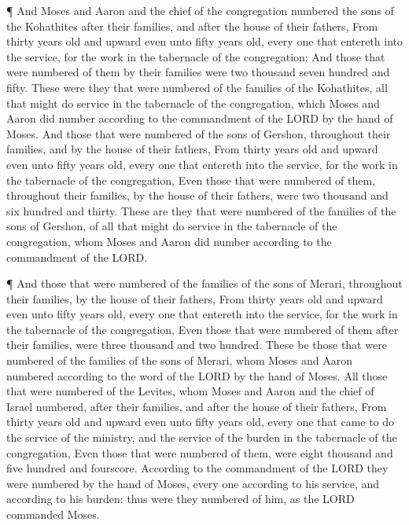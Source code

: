  ¶ And Moses and Aaron and the chief of the congregation
numbered the sons of the Kohathites after their families, and after the
house of their fathers,  From thirty years old and upward
even unto fifty years old, every one that entereth into the service, for
the work in the tabernacle of the congregation:  And those
that were numbered of them by their families were two thousand seven
hundred and fifty.  These were they that were numbered of
the families of the Kohathites, all that might do service in the
tabernacle of the congregation, which Moses and Aaron did number
according to the commandment of the LORD by the hand of Moses.
 And those that were numbered of the sons of Gershon,
throughout their families, and by the house of their fathers,
 From thirty years old and upward even unto fifty years
old, every one that entereth into the service, for the work in the
tabernacle of the congregation,  Even those that were
numbered of them, throughout their families, by the house of their
fathers, were two thousand and six hundred and thirty. 
These are they that were numbered of the families of the sons of
Gershon, of all that might do service in the tabernacle of the
congregation, whom Moses and Aaron did number according to the
commandment of the LORD.

 ¶ And those that were numbered of the families of the sons
of Merari, throughout their families, by the house of their fathers,
 From thirty years old and upward even unto fifty years
old, every one that entereth into the service, for the work in the
tabernacle of the congregation,  Even those that were
numbered of them after their families, were three thousand and two
hundred.  These be those that were numbered of the families
of the sons of Merari, whom Moses and Aaron numbered according to the
word of the LORD by the hand of Moses.  All those that were
numbered of the Levites, whom Moses and Aaron and the chief of Israel
numbered, after their families, and after the house of their fathers,
 From thirty years old and upward even unto fifty years
old, every one that came to do the service of the ministry, and the
service of the burden in the tabernacle of the congregation,
 Even those that were numbered of them, were eight thousand
and five hundred and fourscore.  According to the
commandment of the LORD they were numbered by the hand of Moses, every
one according to his service, and according to his burden: thus were
they numbered of him, as the LORD commanded Moses.

